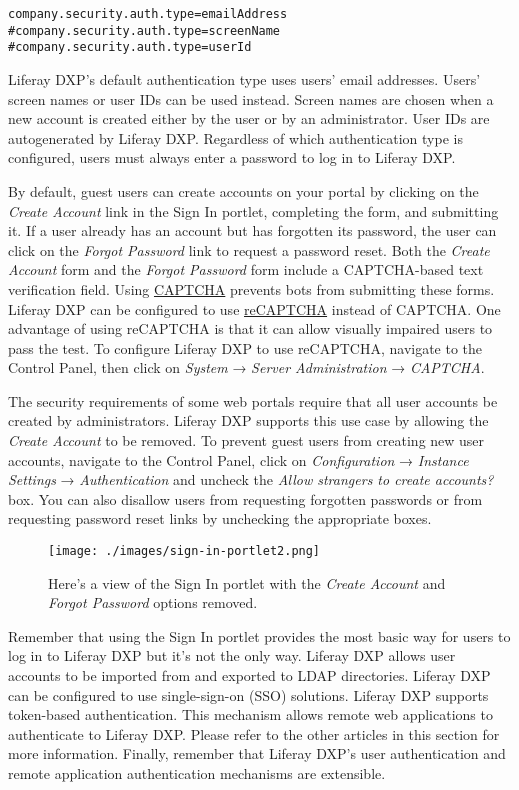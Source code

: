 \begin{verbatim}
company.security.auth.type=emailAddress
#company.security.auth.type=screenName
#company.security.auth.type=userId
\end{verbatim}

Liferay DXP's default authentication type uses users' email addresses.
Users' screen names or user IDs can be used instead. Screen names are
chosen when a new account is created either by the user or by an
administrator. User IDs are autogenerated by Liferay DXP. Regardless of
which authentication type is configured, users must always enter a
password to log in to Liferay DXP.

By default, guest users can create accounts on your portal by clicking
on the \emph{Create Account} link in the Sign In portlet, completing the
form, and submitting it. If a user already has an account but has
forgotten its password, the user can click on the \emph{Forgot Password}
link to request a password reset. Both the \emph{Create Account} form
and the \emph{Forgot Password} form include a CAPTCHA-based text
verification field. Using \href{http://www.captcha.net}{CAPTCHA}
prevents bots from submitting these forms. Liferay DXP can be configured
to use
\href{https://www.google.com/recaptcha/intro/index.html}{reCAPTCHA}
instead of CAPTCHA. One advantage of using reCAPTCHA is that it can
allow visually impaired users to pass the test. To configure Liferay DXP
to use reCAPTCHA, navigate to the Control Panel, then click on
\emph{System} → \emph{Server Administration} → \emph{CAPTCHA}.

The security requirements of some web portals require that all user
accounts be created by administrators. Liferay DXP supports this use
case by allowing the \emph{Create Account} to be removed. To prevent
guest users from creating new user accounts, navigate to the Control
Panel, click on \emph{Configuration} → \emph{Instance Settings} →
\emph{Authentication} and uncheck the \emph{Allow strangers to create
accounts?} box. You can also disallow users from requesting forgotten
passwords or from requesting password reset links by unchecking the
appropriate boxes.

\begin{figure}
\centering
\texttt{[image: ./images/sign-in-portlet2.png]}
\caption{Here's a view of the Sign In portlet with the \emph{Create
Account} and \emph{Forgot Password} options removed.}
\end{figure}

Remember that using the Sign In portlet provides the most basic way for
users to log in to Liferay DXP but it's not the only way. Liferay DXP
allows user accounts to be imported from and exported to LDAP
directories. Liferay DXP can be configured to use single-sign-on (SSO)
solutions. Liferay DXP supports token-based authentication. This
mechanism allows remote web applications to authenticate to Liferay DXP.
Please refer to the other articles in this section for more information.
Finally, remember that Liferay DXP's user authentication and remote
application authentication mechanisms are extensible.

